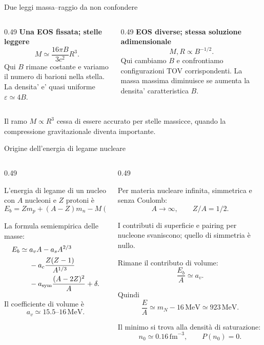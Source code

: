 \begin{frame}{Due leggi massa--raggio da non confondere}
\small
\begin{columns}[T,onlytextwidth]
\begin{column}{0.49\textwidth}
\textbf{Una EOS fissata; stelle leggere}
\[
M\simeq\frac{16\pi B}{3c^2}R^3.
\]
Qui $B$ rimane costante e variamo
il numero di barioni nella stella.
\medskip
La densita' e' quasi uniforme
$\varepsilon\simeq4B$.
\end{column}
\begin{column}{0.49\textwidth}
\textbf{EOS diverse; stessa soluzione adimensionale}
\[
M,R\propto B^{-1/2}.
\]
Qui cambiamo $B$ e confrontiamo
configurazioni TOV corrispondenti.
\medskip
La massa massima diminuisce
se aumenta la densita' caratteristica $B$.
\end{column}
\end{columns}
\medskip
Il ramo $M\propto R^3$ cessa di essere accurato per stelle massicce,
quando la compressione gravitazionale diventa importante.
\end{frame}


\begin{frame}{Origine dell'energia di legame nucleare}
\small
\begin{columns}[T,onlytextwidth]
\begin{column}{0.49\textwidth}

L'energia di legame di un nucleo
con $A$ nucleoni e $Z$ protoni è
\[
E_b=Zm_p+(A-Z)m_n-M(A,Z).
\]

La formula semiempirica delle masse:
\[
\begin{aligned}
E_b\simeq{}&
a_v A-a_s A^{2/3}\\
&-a_c\frac{Z(Z-1)}{A^{1/3}}\\
&-a_{\rm sym}\frac{(A-2Z)^2}{A}
+\delta .
\end{aligned}
\]

Il coefficiente di volume è
\[
a_v\simeq 15.5\text{--}16\,\mathrm{MeV}.
\]

\end{column}
\begin{column}{0.49\textwidth}

Per materia nucleare infinita,
simmetrica e senza Coulomb:
\[
A\to\infty,\qquad Z/A=1/2.
\]

I contributi di superficie e pairing
per nucleone svaniscono;
quello di simmetria è nullo.

Rimane il contributo di volume:
\[
\frac{E_b}{A}\simeq a_v.
\]

Quindi
\[
\frac EA\simeq m_N-16\,\mathrm{MeV}
\simeq923\,\mathrm{MeV}.
\]

Il minimo si trova alla densità
di saturazione:
\[
n_0\simeq0.16\,\mathrm{fm}^{-3},
\qquad P(n_0)=0.
\]

\end{column}
\end{columns}
\end{frame}



